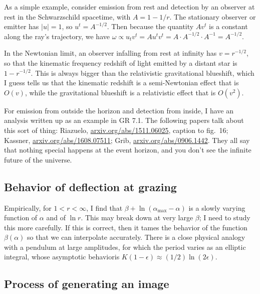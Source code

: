 \documentclass{article}
\begin{document}
As a simple example, consider emission from rest and detection
by an observer at rest in the Schwarzschild spacetime, with $A=1-1/r$.
The stationary observer or emitter has $|u|=1$, so $u^t=A^{-1/2}$.
Then because the quantity $Av^t$ is a constant along the ray's trajectory, we have
$\omega \propto u_t v^t = Au^t v^t = A\cdot A^{-1/2}\cdot A^{-1}=A^{-1/2}$.

In the Newtonian limit, an observer
infalling from rest at infinity has $v=r^{-1/2}$, so that the kinematic frequency redshift
of light emitted by a distant star is $1-r^{-1/2}$. This is
always bigger than the relativistic gravitational blueshift, which I guess tells us that
the kinematic redshift is a semi-Newtonian effect that is $O(v)$, while the gravitational blueshift is
a relativistic effect that is $O(v^2)$.

For emission from outside the horizon and
detection from inside, I have an analysis written up as an example
in GR 7.1.  The following papers talk about this sort of
thing: Riazuelo, \url{arxiv.org/abs/1511.06025}, caption to fig.~16;
Kassner, \url{arxiv.org/abs/1608.07511}; Grib,
\url{arxiv.org/abs/0906.1442}.  They all say that nothing special
happens at the event horizon, and you don't see the infinite future of
the universe.

\subsection{Behavior of deflection at grazing}

Empirically, for $1<r<\infty$, I find that $\beta+\ln(\alpha_\text{max}-\alpha)$ is a slowly
varying function of $\alpha$ and of $\ln r$. This may break down at very large $\beta$; I need
to study this more carefully. If this is correct, then it
tames the behavior of the function
$\beta(\alpha)$ so that we can interpolate accurately. There is a close physical analogy
with a pendulum at large amplitudes, for which the period varies as an elliptic integral,
whose asymptotic behavioris $K(1-\epsilon)\approx(1/2)\ln(2\epsilon)$.

\subsection{Process of generating an image}
\end{document}
